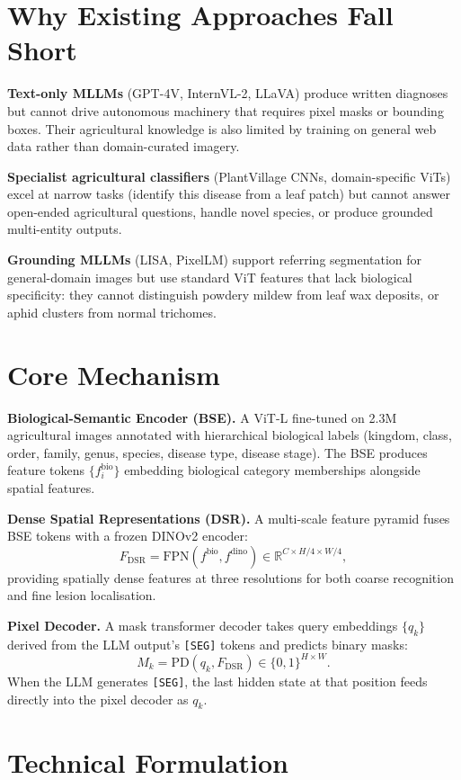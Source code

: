 \documentclass[10pt,twocolumn]{article}
\begin{document}
\section{Why Existing Approaches Fall Short}

\textbf{Text-only MLLMs} (GPT-4V, InternVL-2, LLaVA) produce written
diagnoses but cannot drive autonomous machinery that requires pixel masks
or bounding boxes. Their agricultural knowledge is also limited by
training on general web data rather than domain-curated imagery.

\textbf{Specialist agricultural classifiers} (PlantVillage CNNs,
domain-specific ViTs) excel at narrow tasks (identify this disease from
a leaf patch) but cannot answer open-ended agricultural questions,
handle novel species, or produce grounded multi-entity outputs.

\textbf{Grounding MLLMs} (LISA, PixelLM) support referring segmentation
for general-domain images but use standard ViT features that lack
biological specificity: they cannot distinguish powdery mildew from
leaf wax deposits, or aphid clusters from normal trichomes.

\section{Core Mechanism}

\textbf{Biological-Semantic Encoder (BSE).}
A ViT-L fine-tuned on 2.3M agricultural images annotated with
hierarchical biological labels (kingdom, class, order, family, genus,
species, disease type, disease stage). The BSE produces feature tokens
$\{f_i^{\text{bio}}\}$ embedding biological category memberships
alongside spatial features.

\textbf{Dense Spatial Representations (DSR).}
A multi-scale feature pyramid fuses BSE tokens with a frozen DINOv2
encoder:
\[
F_{\text{DSR}} = \text{FPN}(f^{\text{bio}}, f^{\text{dino}})
               \in \mathbb{R}^{C \times H/4 \times W/4},
\]
providing spatially dense features at three resolutions for both
coarse recognition and fine lesion localisation.

\textbf{Pixel Decoder.}
A mask transformer decoder takes query embeddings $\{q_k\}$ derived
from the LLM output's \texttt{[SEG]} tokens and predicts binary masks:
\[
M_k = \text{PD}(q_k, F_{\text{DSR}}) \in \{0,1\}^{H \times W}.
\]
When the LLM generates \texttt{[SEG]}, the last hidden state at that
position feeds directly into the pixel decoder as $q_k$.

\section{Technical Formulation}
\end{document}
